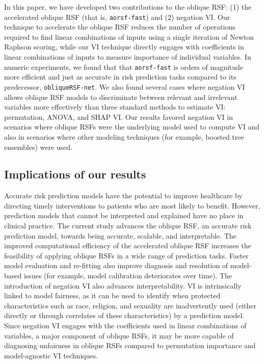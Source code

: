 \documentclass[twoside,11pt]{article}\usepackage[]{graphicx}\usepackage[]{xcolor}
\newcommand{\ie}{that is}
\newcommand{\eg}{for example}
\begin{document}
In this paper, we have developed two contributions to the oblique RSF: (1) the accelerated oblique RSF (\ie, \texttt{aorsf-fast}) and (2) negation VI. Our technique to accelerate the oblique RSF reduces the number of operations required to find linear combinations of inputs using a single iteration of Newton Raphson scoring, while our VI technique directly engages with coefficients in linear combinations of inputs to measure importance of individual variables. In numeric experiments, we found that that \texttt{aorsf-fast} is orders of magnitude more efficient and just as accurate in risk prediction tasks compared to its predecessor, \texttt{obliqueRSF-net}. We also found several cases where negation VI allows oblique RSF models to discriminate between relevant and irrelevant variables more effectively than three standard methods to estimate VI: permutation, ANOVA, and SHAP VI. Our results favored negation VI in scenarios where oblique RSFs were the underlying model used to compute VI and also in scenarios where other modeling techniques (\eg, boosted tree ensembles) were used.

\subsection{Implications of our results}

Accurate risk prediction models have the potential to improve healthcare by directing timely interventions to patients who are most likely to benefit. However, prediction models that cannot be interpreted and explained have no place in clinical practice. The current study advances the oblique RSF, an accurate risk prediction model, towards being accurate, scalable, and interpretable. The improved computational efficiency of the accelerated oblique RSF increases the feasibility of applying oblique RSFs in a wide range of prediction tasks. Faster model evaluation and re-fitting also improve diagnosis and resolution of model-based issues (\eg, model calibration deteriorates over time). The introduction of negation VI also advances interpretability. VI is intrinsically linked to model fairness, as it can be used to identify when protected characteristics such as race, religion, and sexuality are inadvertently used (either directly or through correlates of these characteristics) by a prediction model. Since negation VI  engages with the coefficients used in linear combinations of variables, a major component of oblique RSFs, it may be more capable of diagnosing unfairness in oblique RSFs compared to permutation importance and model-agnostic VI techniques.
\end{document}
